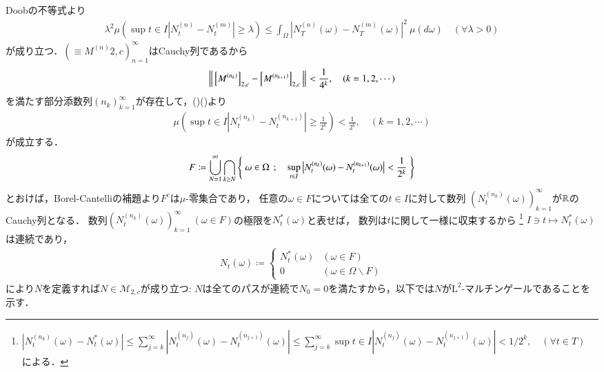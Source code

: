 \begin{prf}
		Doobの不等式より
		\begin{align}
			\lambda^2 \mu\left(\sup{t \in I}{\left| N^{(n)}_t - N^{(m)}_t \right| \geq \lambda}\right) 
			\leq \int_{\Omega} \left| N^{(n)}_T(\omega) - N^{(m)}_T(\omega) \right|^2\ \mu(d\omega)
			\quad (\forall \lambda > 0)
			\label{eq:prp_M_2_c_hilbert_2}
		\end{align}
		が成り立つ．$\left(\equiv{M^{(n)}}{2,c}\right)_{n=1}^{\infty}$はCauchy列であるから
		\begin{align}
			\left\|\, \left[M^{(n_k)}\right]_{2,c} - \left[M^{(n_{k+1})}\right]_{2,c}\, \right\|_{} < \frac{1}{4^k}, \quad (k = 1,2,\cdots) \label{eq:mart_hilbert_1}
		\end{align}
		を満たす部分添数列$(n_k)_{k=1}^{\infty}$が存在して，()()より
		\begin{align}
			\mu\left(\sup{t \in I}{\left| N^{(n_k)}_t - N^{(n_{k+1})}_t \right| \geq \frac{1}{2^k}}\right) < \frac{1}{2^k}, \quad (k=1,2,\cdots)
		\end{align}
		が成立する．
		\begin{align}
			F \coloneqq \bigcup_{N=1}^{\infty} \bigcap_{k \geq N} 
				\left\{\ \omega \in \Omega\ \, ; \quad \operatorname*{sup}_{t \in I} \left| N^{(n_k)}_t(\omega) - N^{(n_{k+1})}_t(\omega) \right| < \frac{1}{2^k}\ \right\}
		\end{align}
		とおけば，Borel-Cantelliの補題より$F^c$は$\mu$-零集合であり，
		任意の$\omega \in F$については全ての$t \in I$に対して数列
		$\left(N^{(n_k)}_t(\omega)\right)_{k=1}^{\infty}$が$\mathbb{R}$のCauchy列となる．
		数列$\left(N^{(n_k)}_t(\omega)\right)_{k=1}^{\infty}\ (\omega \in F)$の極限を$N^*_t(\omega)$と表せば，
		数列は$t$に関して一様に収束するから
		\footnote{
			$\left| N^{(n_k)}_t(\omega) - N^*_t(\omega) \right| \leq \sum_{j=k}^{\infty} \left| N^{(n_j)}_t(\omega) - N^{(n_{j+1})}_t(\omega) \right|
			\leq \sum_{j=k}^{\infty} \sup{t \in I}{\left| N^{(n_j)}_t(\omega) - N^{(n_{j+1})}_t(\omega) \right|} < 1/2^k, \quad (\forall t \in T)$
			による．
		}
		$I \ni t \longmapsto N^*_t(\omega)$は連続であり，
		\begin{align}
			N_t(\omega) \coloneqq 
			\begin{cases}
				N^*_t(\omega) & (\omega \in F) \\
				0 & (\omega \in \Omega \backslash F)
			\end{cases}
		\end{align}
		により$N$を定義すれば$N \in \mathcal{M}_{2,c}$が成り立つ:
		$N$は全てのパスが連続で$N_0 = 0$を満たすから，以下では$N$が$\mathrm{L}^2$-マルチンゲールであることを示す．

\end{prf}
